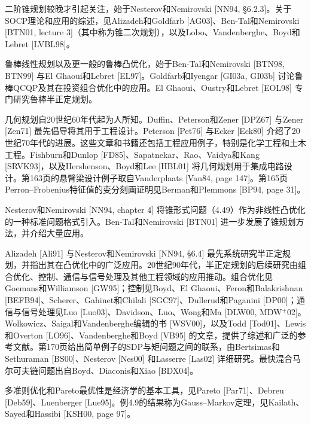 二阶锥规划较晚才引起关注，始于Nesterov和Nemirovski [NN94, §6.2.3]。关于SOCP理论和应用的综述，见Alizadeh和Goldfarb [AG03]、Ben-Tal和Nemirovski [BTN01, lecture 3]（其中称为锥二次规划），以及Lobo、Vandenberghe、Boyd和Lebret [LVBL98]。

鲁棒线性规划以及更一般的鲁棒凸优化，始于Ben-Tal和Nemirovski [BTN98, BTN99] 与El Ghaoui和Lebret [EL97]。Goldfarb和Iyengar [GI03a, GI03b] 讨论鲁棒QCQP及其在投资组合优化中的应用。El Ghaoui、Oustry和Lebret [EOL98] 专门研究鲁棒半正定规划。

几何规划自20世纪60年代起为人所知。Duffin、Peterson和Zener [DPZ67] 与Zener [Zen71] 最先倡导将其用于工程设计。Peterson [Pet76] 与Ecker [Eck80] 介绍了20世纪70年代的进展。这些文章和书籍还包括工程应用例子，特别是化学工程和土木工程。Fishburn和Dunlop [FD85]、Sapatnekar、Rao、Vaidya和Kang [SRVK93]，以及Hershenson、Boyd和Lee [HBL01] 将几何规划用于集成电路设计。第163页的悬臂梁设计例子取自Vanderplaats [Van84, page 147]。第165页Perron--Frobenius特征值的变分刻画证明见Berman和Plemmons [BP94, page 31]。

Nesterov和Nemirovski [NN94, chapter 4] 将锥形式问题（4.49）作为非线性凸优化的一种标准问题格式引入。Ben-Tal和Nemirovski [BTN01] 进一步发展了锥规划方法，并介绍大量应用。

Alizadeh [Ali91] 与Nesterov和Nemirovski [NN94, §6.4] 最先系统研究半正定规划，并指出其在凸优化中的广泛应用。20世纪90年代，半正定规划的后续研究由组合优化、控制、通信与信号处理及其他工程领域的应用推动。组合优化见Goemans和Williamson [GW95]；控制见Boyd、El Ghaoui、Feron和Balakrishnan [BEFB94]、Scherer、Gahinet和Chilali [SGC97]、Dullerud和Paganini [DP00]；通信与信号处理见Luo [Luo03]、Davidson、Luo、Wong和Ma [DLW00, MDW$^+$02]。Wolkowicz、Saigal和Vandenberghe编辑的书 [WSV00]，以及Todd [Tod01]、Lewis和Overton [LO96]、Vandenberghe和Boyd [VB95] 的文章，提供了综述和广泛的参考文献。第170页给出简单例子的SDP与矩问题之间的联系，由Bertsimas和Sethuraman [BS00]、Nesterov [Nes00] 和Lasserre [Las02] 详细研究。最快混合马尔可夫链问题出自Boyd、Diaconis和Xiao [BDX04]。

多准则优化和Pareto最优性是经济学的基本工具，见Pareto [Par71]、Debreu [Deb59]、Luenberger [Lue95]。例4.9的结果称为Gauss--Markov定理，见Kailath、Sayed和Hassibi [KSH00, page 97]。
